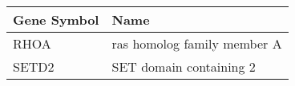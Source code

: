\begin{tabular}{ll}
\toprule
Gene Symbol &                        Name \\
\midrule
       RHOA & ras homolog family member A \\
      SETD2 &     SET domain containing 2 \\
\bottomrule
\end{tabular}
